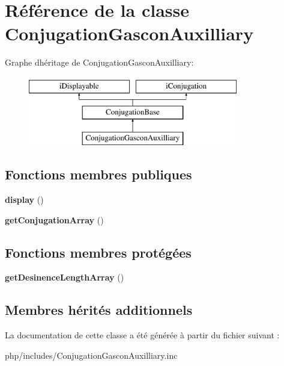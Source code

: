 \hypertarget{classConjugationGasconAuxilliary}{}\section{Référence de la classe Conjugation\+Gascon\+Auxilliary}
\label{classConjugationGasconAuxilliary}
Graphe d\textquotesingle{}héritage de Conjugation\+Gascon\+Auxilliary\+:\begin{figure}[H]
\begin{center}
\leavevmode
\includegraphics[height=3.000000cm]{classConjugationGasconAuxilliary}
\end{center}
\end{figure}
\subsection*{Fonctions membres publiques}
\begin{DoxyCompactItemize}
\item 
\hypertarget{classConjugationGasconAuxilliary_ace722e9b661a8c1ff4ca860682124dd4}{}\label{classConjugationGasconAuxilliary_ace722e9b661a8c1ff4ca860682124dd4} 
{\bfseries display} ()
\item 
\hypertarget{classConjugationGasconAuxilliary_ad29935aa41057e3fb1967ee425f622e2}{}\label{classConjugationGasconAuxilliary_ad29935aa41057e3fb1967ee425f622e2} 
{\bfseries get\+Conjugation\+Array} ()
\end{DoxyCompactItemize}
\subsection*{Fonctions membres protégées}
\begin{DoxyCompactItemize}
\item 
\hypertarget{classConjugationGasconAuxilliary_aee22cc89619cf7a697b30f2b2ab0eb73}{}\label{classConjugationGasconAuxilliary_aee22cc89619cf7a697b30f2b2ab0eb73} 
{\bfseries get\+Desinence\+Length\+Array} ()
\end{DoxyCompactItemize}
\subsection*{Membres hérités additionnels}


La documentation de cette classe a été générée à partir du fichier suivant \+:\begin{DoxyCompactItemize}
\item 
php/includes/Conjugation\+Gascon\+Auxilliary.\+inc\end{DoxyCompactItemize}
